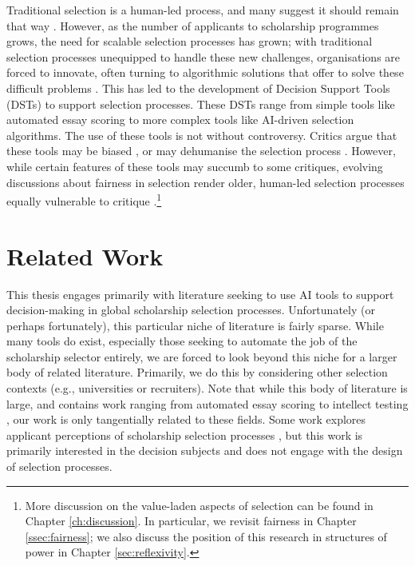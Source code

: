 Traditional selection is a human-led process, and many suggest it should remain that way \cite{Latzer_Hollnbuchner_Just_Saurwein_2014}. However, as the number of applicants to scholarship programmes grows, the need for scalable selection processes has grown; with traditional selection processes unequipped to handle these new challenges, organisations are forced to innovate, often turning to algorithmic solutions that offer to solve these difficult problems \cite{Latzer_Hollnbuchner_Just_Saurwein_2014}. This has led to the development of Decision Support Tools (DSTs) to support selection processes. These DSTs range from simple tools like automated essay scoring to more complex tools like AI-driven selection algorithms. The use of these tools is not without controversy. Critics argue that these tools may be biased \cite{dwork_fairness_2012}, or may dehumanise the selection process \cite{binns_its_2018}. However, while certain features of these tools may succumb to some critiques, evolving discussions about fairness in selection render older, human-led selection processes equally vulnerable to critique \cite{Ahnaf2023AHPAP,pmlr-v80-kearns18a}.\footnote{More discussion on the value-laden aspects of selection can be found in Chapter \ref{ch:discussion}. In particular, we revisit fairness in Chapter \ref{ssec:fairness}; we also discuss the position of this research in structures of power in Chapter \ref{sec:reflexivity}.}

\section{Related Work}
This thesis engages primarily with literature seeking to use AI tools to support decision-making in global scholarship selection processes. Unfortunately (or perhaps fortunately), this particular niche of literature is fairly sparse. While many tools do exist, especially those seeking to automate the job of the scholarship selector entirely, we are forced to look beyond this niche for a larger body of related literature. Primarily, we do this by considering other selection contexts (e.g., universities or recruiters). Note that while this body of literature is large, and contains work ranging from automated essay scoring to intellect testing \cite{cozma_automated_2018,condon2014international}, our work is only tangentially related to these fields. Some work explores applicant perceptions of scholarship selection processes \cite{10.1145/3351095.3372867}, but this work is primarily interested in the decision subjects and does not engage with the design of selection processes.

